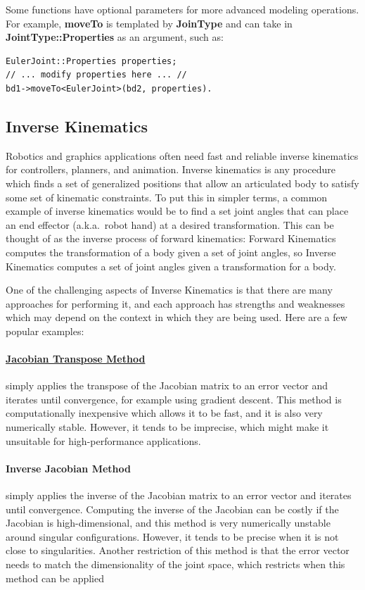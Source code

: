 Some functions have optional parameters for more advanced modeling
operations. For example, \textbf{moveTo} is templated by \textbf{JoinType} and
can take in \textbf{JointType::Properties} as an argument, such as:
\begin{lstlisting}
EulerJoint::Properties properties;
// ... modify properties here ... //
bd1->moveTo<EulerJoint>(bd2, properties).
\end{lstlisting}

\subsection{Inverse Kinematics}
\label{sec:ik}
Robotics and graphics applications often need fast and reliable inverse kinematics for controllers, planners, and animation. Inverse kinematics is any procedure which finds a set of generalized positions that allow an articulated body to satisfy some set of kinematic constraints. To put this in simpler terms, a common example of inverse kinematics would be to find a set joint angles that can place an end effector (a.k.a.\ robot hand) at a desired transformation. This can be thought of as the inverse process of forward kinematics: Forward Kinematics computes the transformation of a body given a set of joint angles, so Inverse Kinematics computes a set of joint angles given a transformation for a body.

One of the challenging aspects of Inverse Kinematics is that there are many approaches for performing it, and each approach has strengths and weaknesses which may depend on the context in which they are being used. Here are a few popular examples:

\paragraph{\underline{Jacobian Transpose Method}} simply applies the transpose of the Jacobian matrix to an error vector and iterates until convergence, for example using gradient descent. This method is computationally inexpensive which allows it to be fast, and it is also very numerically stable. However, it tends to be imprecise, which might make it unsuitable for high-performance applications.

\paragraph{Inverse Jacobian Method} simply applies the inverse of the Jacobian matrix to an error vector and iterates until convergence. Computing the inverse of the Jacobian can be costly if the Jacobian is high-dimensional, and this method is very numerically unstable around singular configurations. However, it tends to be precise when it is not close to singularities. Another restriction of this method is that the error vector needs to match the dimensionality of the joint space, which restricts when this method can be applied

